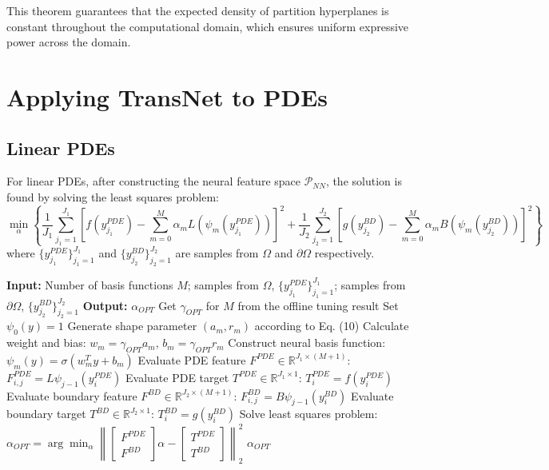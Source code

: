 \documentclass[11pt]{article}
\begin{document}
This theorem guarantees that the expected density of partition hyperplanes is constant throughout the computational domain, which ensures uniform expressive power across the domain.

\section{Applying TransNet to PDEs}

\subsection{Linear PDEs}

For linear PDEs, after constructing the neural feature space $\mathcal{P}_{NN}$, the solution is found by solving the least squares problem:
\begin{equation}
\min_\alpha \left\{\frac{1}{J_1}\sum_{j_1=1}^{J_1} \left[f(y_{j_1}^{PDE}) - \sum_{m=0}^M \alpha_m L(\psi_m(y_{j_1}^{PDE}))\right]^2 + \frac{1}{J_2}\sum_{j_2=1}^{J_2} \left[g(y_{j_2}^{BD}) - \sum_{m=0}^M \alpha_m B(\psi_m(y_{j_2}^{BD}))\right]^2\right\}
\end{equation}
where $\{y_{j_1}^{PDE}\}_{j_1=1}^{J_1}$ and $\{y_{j_2}^{BD}\}_{j_2=1}^{J_2}$ are samples from $\Omega$ and $\partial\Omega$ respectively.

\begin{algorithm}
\caption{Solving linear PDE with TransNet}
\begin{algorithmic}
\STATE \textbf{Input:} Number of basis functions $M$; samples from $\Omega$, $\{y_{j_1}^{PDE}\}_{j_1=1}^{J_1}$; samples from $\partial\Omega$, $\{y_{j_2}^{BD}\}_{j_2=1}^{J_2}$
\STATE \textbf{Output:} $\alpha_{OPT}$
\STATE Get $\gamma_{OPT}$ for $M$ from the offline tuning result
\STATE Set $\psi_0(y) = 1$
\STATE Generate shape parameter $(a_m, r_m)$ according to Eq. (10)
\STATE Calculate weight and bias: $w_m = \gamma_{OPT} a_m$, $b_m = \gamma_{OPT} r_m$
\STATE Construct neural basis function: $\psi_m(y) = \sigma(w_m^T y + b_m)$
\ENDFOR
\STATE Evaluate PDE feature $F^{PDE} \in \mathbb{R}^{J_1 \times (M+1)}$: $F_{i,j}^{PDE} = L\psi_{j-1}(y_i^{PDE})$
\STATE Evaluate PDE target $T^{PDE} \in \mathbb{R}^{J_1 \times 1}$: $T_i^{PDE} = f(y_i^{PDE})$
\STATE Evaluate boundary feature $F^{BD} \in \mathbb{R}^{J_2 \times (M+1)}$: $F_{i,j}^{BD} = B\psi_{j-1}(y_i^{BD})$
\STATE Evaluate boundary target $T^{BD} \in \mathbb{R}^{J_2 \times 1}$: $T_i^{BD} = g(y_i^{BD})$
\STATE Solve least squares problem: $\alpha_{OPT} = \arg \min_\alpha \left\|\begin{bmatrix} F^{PDE} \\ F^{BD} \end{bmatrix} \alpha - \begin{bmatrix} T^{PDE} \\ T^{BD} \end{bmatrix}\right\|_2^2$
\RETURN $\alpha_{OPT}$
\end{algorithmic}
\end{algorithm}
\end{document}
